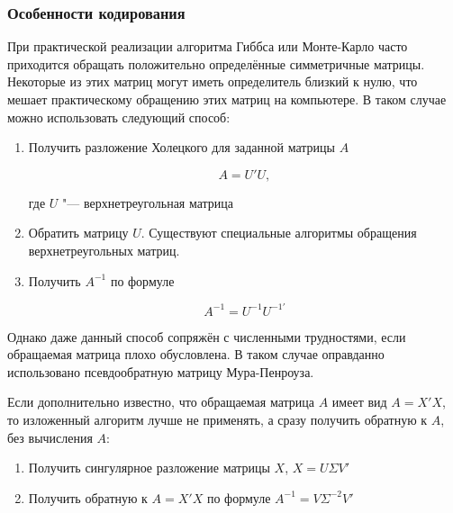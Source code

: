 \documentclass[11pt]{article} %
\newcommand{\eng}[1]{\begin{otherlanguage}{english}#1\end{otherlanguage}}
\begin{document}
\subsubsection{Особенности кодирования}

При практической реализации алгоритма Гиббса или Монте-Карло часто
приходится обращать положительно определённые симметричные матрицы. Некоторые из этих матриц могут иметь определитель близкий к нулю, что мешает практическому обращению этих матриц на компьютере.
В таком случае можно использовать следующий способ:


\begin{enumerate}

\item Получить разложение Холецкого для заданной матрицы $A$

\[
A=U'U,
\]

где $U$ "--- верхнетреугольная матрица

\item Обратить матрицу $U$. Существуют специальные алгоритмы обращения
верхнетреугольных матриц.

\item Получить $A^{-1}$ по формуле

\[
A^{-1}=U^{-1}U^{-1\prime}
\]

\end{enumerate}


Однако даже данный способ сопряжён с численными трудностями, если
обращаемая матрица плохо обусловлена. В таком случае оправданно использовано
псевдообратную матрицу Мура-Пенроуза.

Если дополнительно известно, что обращаемая матрица $A$ имеет вид $A=X'X$, то изложенный алгоритм лучше не применять, а сразу получить обратную к $A$, без вычисления $A$:

\begin{enumerate}
\item Получить сингулярное разложение матрицы $X$, $X=U\Sigma V'$
\item Получить обратную к $A=X'X$ по формуле $A^{-1}=V\Sigma^{-2} V'$
\end{enumerate}


%
%
\end{document}

